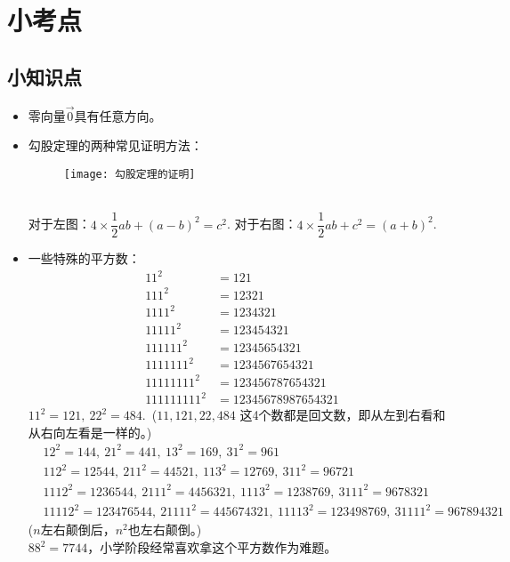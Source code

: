 \chapter{小考点}

\section{小知识点}
\begin{itemize}[leftmargin=\inteval{\myitemleftmargin}pt,itemsep=
   \inteval{\myitemitempsep}pt,topsep=\inteval{\myitemtopsep}pt]
\item  零向量$ \vec{0} $具有任意方向。

\item 勾股定理的两种常见证明方法：
\begin{figure}[htbp]
    \centering
    \texttt{[image: 勾股定理的证明]}
\end{figure}  \\
对于左图：$ 4\times \dfrac{1}{2}ab+(a-b)^2=c^2 $. \hspace{2cm} 
对于右图：$ 4\times \dfrac{1}{2}ab+c^2=(a+b)^2 $. 

\item 一些特殊的平方数：
\begin{align*}
    11^2&=121 \\
    111^2&=12321 \\
    1111^2&=1234321 \\
    11111^2&=123454321 \\
    111111^2&=12345654321 \\
    1111111^2&=1234567654321 \\
    11111111^2&=123456787654321 \\
    111111111^2&=12345678987654321 
\end{align*}
$ 11^2=121,\ 22^2=484 $.\ ($ 11,121,22,484 $
这4个数都是回文数，即从左到右看和从右向左看是一样的。) 
\begin{align*}
    & 12^2=144,\ 21^2=441,\ 13^2=169,\ 31^2=961 \\
    & 112^2=12544,\ 211^2=44521,\ 113^2=12769,\ 311^2=96721 \\
    & 1112^2=1236544,\ 2111^2=4456321,\ 1113^2=1238769,\ 3111^2=9678321 \\
    & 11112^2=123476544,\ 21111^2=445674321,\ 11113^2=123498769,\ 
    31111^2=967894321
\end{align*}
($ n $左右颠倒后，$ n^2 $也左右颠倒。)\\
$ 88^2=7744 $，小学阶段经常喜欢拿这个平方数作为难题。


\end{itemize}

